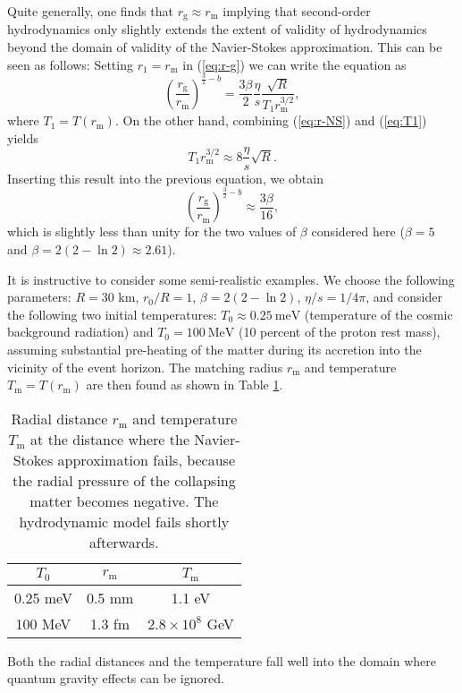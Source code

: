 \documentclass[article,twocolumn]{revtex4}
\newcommand{\be}{\begin{equation}}
\newcommand{\ee}{\end{equation}}
\begin{document}
Quite generally, one finds that $r_\mathrm{g} \approx r_\mathrm{m}$ implying that second-order hydrodynamics only slightly extends the extent of validity of hydrodynamics beyond the domain of validity of the Navier-Stokes approximation. This can be seen as follows: Setting $r_1 = r_\mathrm{m}$ in (\ref{eq:r-g}) we can write the equation as
\be
\left( \frac{r_\mathrm{g}}{r_\mathrm{m}} \right)^{\frac{3}{2} - b} = \frac{3\beta}{2} \frac{\eta}{s} \frac{\sqrt{R}}{T_1 r_\mathrm{m}^{3/2}} ,
\ee
where $T_1 = T(r_\mathrm{m})$. On the other hand, combining (\ref{eq:r-NS}) and (\ref{eq:T1}) yields
\be
T_1 r_\mathrm{m}^{3/2} \approx 8 \frac{\eta}{s} \sqrt{R} .
\ee
Inserting this result into the previous equation, we obtain
\be 
\left( \frac{r_\mathrm{g}}{r_\mathrm{m}} \right)^{\frac{3}{2} - b} \approx \frac{3\beta}{16} ,
\ee
which is slightly less than unity for the two values of $\beta$ considered here ($\beta = 5$ and $\beta = 2(2 - \ln 2) \approx 2.61$).

It is instructive to consider some semi-realistic examples. We choose the following parameters: $R = 30$ km, $r_0/R = 1$, $\beta = 2(2 - \ln 2)$, $\eta/s = 1/4\pi$, and consider the following two initial temperatures: $T_0 \approx 0.25~\mathrm{meV}$ (temperature of the cosmic background radiation) and $T_0 = 100~\mathrm{MeV}$ (10 percent of the proton rest mass), assuming substantial pre-heating of the matter during its accretion into the vicinity of the event horizon. The matching radius $r_\mathrm{m}$ and temperature $T_\mathrm{m} = T(r_\mathrm{m})$ are then found as shown in Table \ref{Tab1}.
\begin{table}[htb]
\centering
\begin{tabular}{|c|c|c|}
\hline
$T_0$ & $r_\mathrm{m}$ & $T_\mathrm{m}$ \\
\hline
0.25 meV & 0.5 mm & 1.1 eV \\
100 MeV & 1.3 fm & $2.8\times 10^8$ GeV \\
\hline
\end{tabular}
\caption{Radial distance $r_\mathrm{m}$ and temperature $T_\mathrm{m}$ at the distance where the Navier-Stokes approximation fails, because the radial pressure of the collapsing matter becomes negative. The hydrodynamic model fails shortly afterwards.}
\label{Tab1}
\end{table}
Both the radial distances and the temperature fall well into the domain where quantum gravity effects can be ignored.
\end{document}
